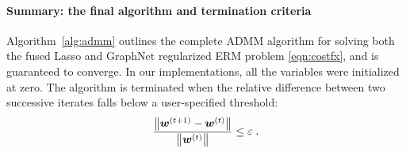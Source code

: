 \paragraph{Summary: the final algorithm and termination criteria}
Algorithm~\ref{alg:admm} outlines the complete ADMM algorithm for solving both the fused Lasso and GraphNet regularized ERM problem \eqref{eqn:costfx}, and is guaranteed to converge.
In our implementations, all the variables were initialized at zero.
The algorithm is terminated when the relative difference between two successive iterates falls below a user-specified threshold:
\begin{equation}
	\frac{\left\| {\bm{w}}^{(t+1)} - {\bm{w}}^{(t)} \right\|}
		{\left\| {\bm{w}}^{(t)} \right\|}
	\leq \varepsilon \;.
	\label{eqn:admm,termin}
\end{equation}

